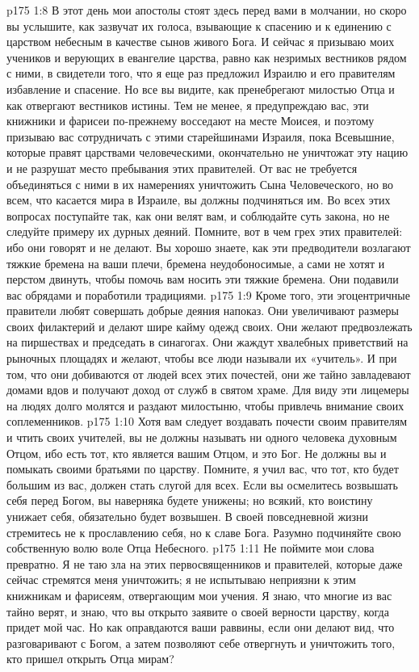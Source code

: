 \vs p175 1:8 В этот день мои апостолы стоят здесь перед вами в молчании, но скоро вы услышите, как зазвучат их голоса, взывающие к спасению и к единению с царством небесным в качестве сынов живого Бога. И сейчас я призываю моих учеников и верующих в евангелие царства, равно как незримых вестников рядом с ними, в свидетели того, что я еще раз предложил Израилю и его правителям избавление и спасение. Но все вы видите, как пренебрегают милостью Отца и как отвергают вестников истины. Тем не менее, я предупреждаю вас, эти книжники и фарисеи по\hyp{}прежнему восседают на месте Моисея, и поэтому призываю вас сотрудничать с этими старейшинами Израиля, пока Всевышние, которые правят царствами человеческими, окончательно не уничтожат эту нацию и не разрушат место пребывания этих правителей. От вас не требуется объединяться с ними в их намерениях уничтожить Сына Человеческого, но во всем, что касается мира в Израиле, вы должны подчиняться им. Во всех этих вопросах поступайте так, как они велят вам, и соблюдайте суть закона, но не следуйте примеру их дурных деяний. Помните, вот в чем грех этих правителей: ибо они говорят и не делают. Вы хорошо знаете, как эти предводители возлагают тяжкие бремена на ваши плечи, бремена неудобоносимые, а сами не хотят и перстом двинуть, чтобы помочь вам носить эти тяжкие бремена. Они подавили вас обрядами и поработили традициями.
\vs p175 1:9 Кроме того, эти эгоцентричные правители любят совершать добрые деяния напоказ. Они увеличивают размеры своих филактерий и делают шире кайму одежд своих. Они желают предвозлежать на пиршествах и председать в синагогах. Они жаждут хвалебных приветствий на рыночных площадях и желают, чтобы все люди называли их «учитель». И при том, что они добиваются от людей всех этих почестей, они же тайно завладевают домами вдов и получают доход от служб в святом храме. Для виду эти лицемеры на людях долго молятся и раздают милостыню, чтобы привлечь внимание своих соплеменников.
\vs p175 1:10 Хотя вам следует воздавать почести своим правителям и чтить своих учителей, вы не должны называть ни одного человека духовным Отцом, ибо есть тот, кто является вашим Отцом, и это Бог. Не должны вы и помыкать своими братьями по царству. Помните, я учил вас, что тот, кто будет большим из вас, должен стать слугой для всех. Если вы осмелитесь возвышать себя перед Богом, вы наверняка будете унижены; но всякий, кто воистину унижает себя, обязательно будет возвышен. В своей повседневной жизни стремитесь не к прославлению себя, но к славе Бога. Разумно подчиняйте свою собственную волю воле Отца Небесного.
\vs p175 1:11 Не поймите мои слова превратно. Я не таю зла на этих первосвященников и правителей, которые даже сейчас стремятся меня уничтожить; я не испытываю неприязни к этим книжникам и фарисеям, отвергающим мои учения. Я знаю, что многие из вас тайно верят, и знаю, что вы открыто заявите о своей верности царству, когда придет мой час. Но как оправдаются ваши раввины, если они делают вид, что разговаривают с Богом, а затем позволяют себе отвергнуть и уничтожить того, кто пришел открыть Отца мирам?
